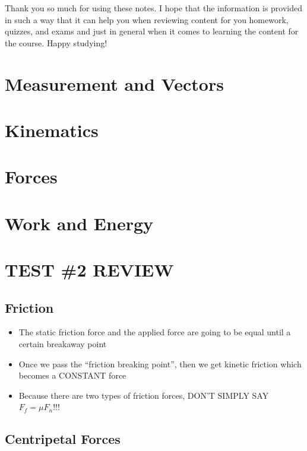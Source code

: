 \documentclass{package/notes}
\begin{document}
Thank you so much for using these notes. I hope that the information is provided in such a way that it can help you when reviewing content for you homework, quizzes, and exams and just in general when it comes to learning the content for the course. Happy studying!

\newpage


\chapter{Measurement and Vectors}



\chapter{Kinematics}



\chapter{Forces}



\chapter{Work and Energy}


\chapter{TEST \#2 REVIEW}

\section{Friction}

\begin{itemize}
    \item The static friction force and the applied force are going to be equal until a certain breakaway point
    \item Once we pass the “friction breaking point”, then we get kinetic friction which becomes a CONSTANT force
    \item Because there are two types of friction forces, DON’T SIMPLY SAY $F_f = \mu F_n$!!!
\end{itemize}


\section{Centripetal Forces}
\end{document}
